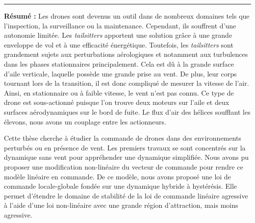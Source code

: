 \pagestyle{empty} %

\begin{vcenterpage} %
\noindent\rule[2pt]{\textwidth}{0.5pt}

{\large\textbf{Résumé :}}
Les drones sont devenus un outil dans de nombreux domaines tels que l'inspection, la surveillance ou la maintenance. Cependant, ils souffrent d'une autonomie limitée. Les \textit{tailsitters} apportent une solution grâce à une grande enveloppe de vol et à une efficacité énergétique. Toutefois, les \textit{tailsitters} sont grandement sujets aux perturbations aérologiques et notamment aux turbulences dans les phases stationnaires principalement. Cela est dû à la grande surface d'aile verticale, laquelle possède une grande prise au vent. De plus, leur corps tournant lors de la transition, il est donc compliqué de mesurer la vitesse de l'air.  Ainsi, en stationnaire ou à faible vitesse, le vent n'est pas connu. Ce type de drone est sous-actionné puisque l'on trouve deux moteurs sur l'aile et deux surfaces aérodynamiques sur le bord de fuite. Le flux d'air des hélices soufflant les élevons, nous avons un couplage entre les actionneurs.

Cette thèse cherche à étudier la commande de drones dans des environnements perturbés ou en présence de vent. Les premiers travaux se sont concentrés sur la dynamique sans vent pour appréhender une dynamique simplifiée. Nous avons pu proposer une modification non-linéaire du vecteur de commande pour rendre ce modèle linéaire en commande. De ce modèle, nous avons proposé une loi de commande locale-globale fondée sur une dynamique hybride à hystérésis. Elle permet d'étendre le domaine de stabilité de la loi de commande linéaire agressive à l'aide d'une loi non-linéaire avec une grande région d'attraction, mais moins agressive.


\end{vcenterpage}
